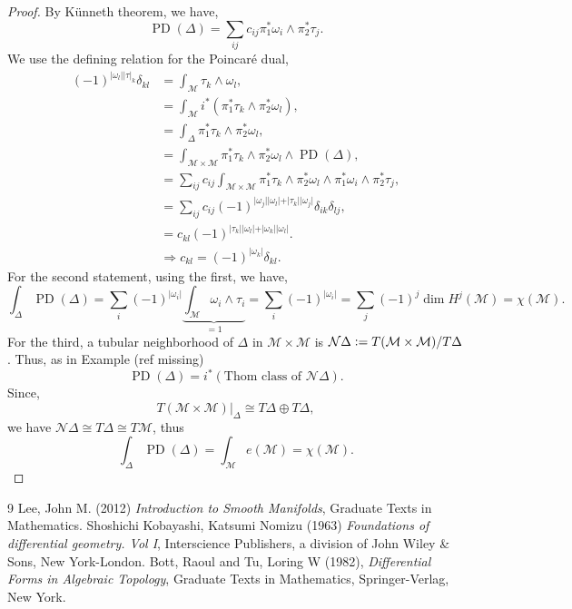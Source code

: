 \documentclass[8pt]{article}
\DeclareMathOperator{\PD}{PD}
\newcommand{\defeq}{\vcentcolon=}
\newcommand{\M}[0]{\mathcal{M}}
\begin{document}
\begin{proof}
  By Künneth theorem, we have,
  \begin{equation*}
    \PD(\Delta) = \sum_{ij}c_{ij}\pi_1^*\omega_i\wedge\pi_2^*\tau_j.
  \end{equation*}
  We use the defining relation for the Poincaré dual, 
  \begin{align*}
    (-1)^{\vert\omega_l\vert\vert\tau\vert_k}\delta_{kl}& =\int_\M\tau_k\wedge\omega_l,\\
    & = \int_\M i^*(\pi^*_1\tau_k\wedge\pi_2^*\omega_l),\\
    & = \int_\Delta \pi_1^*\tau_k\wedge\pi_2^*\omega_l,\\
    & = \int_{\M\times\M}\pi_1^*\tau_k\wedge\pi_2^*\omega_l\wedge\PD(\Delta),\\
    & = \sum_{ij}c_{ij}\int_{\M\times\M}\pi^*_1\tau_k\wedge\pi_2^*\omega_l\wedge\pi^*_1\omega_i\wedge\pi_2^*\tau_j,\\
    & = \sum_{ij}c_{ij}(-1)^{\vert\omega_j\vert\vert\omega_l\vert+\vert\tau_k\vert\vert\omega_j\vert}\delta_{ik}\delta_{lj},\\
    & = c_{kl}(-1)^{\vert\tau_k\vert\vert\omega_l\vert+\vert\omega_k\vert\vert\omega_l\vert}.\\
    &\Rightarrow c_{kl} = (-1)^{\vert\omega_k\vert}\delta_{kl}.
  \end{align*}
  For the second statement, using the first, we have,
  \begin{equation*}
    \int_\Delta\PD(\Delta) = \sum_{i}(-1)^{\vert\omega_i\vert}\underbrace{\int_\M\omega_i\wedge\tau_i}_{=1}=\sum_{i}(-1)^{\vert\omega_i\vert} = \sum_{j}(-1)^j\dim H^j(\M)=\chi(\M).
  \end{equation*}
  For the third, a tubular neighborhood of $\Delta$ in $\M\times\M$ is $\mathcal{N}\Delta\defeq T(\M\times\M)/T\Delta$. Thus, as in Example (ref missing)
  \begin{equation*}
    \PD(\Delta)=i^*(\text{Thom class of }\mathcal{N}\Delta).
  \end{equation*}
  Since,
  \begin{equation*}
    T(\M\times\M)|_\Delta\cong T\Delta\oplus T\Delta,
  \end{equation*}
  we have $\mathcal{N}\Delta\cong T\Delta\cong T\M$, thus 
  \begin{equation*}
    \int_\Delta\PD(\Delta) = \int_\M e(\M)=\chi(\M).
  \end{equation*}
\end{proof}

\begin{thebibliography}{9}
Lee, John M. (2012) \emph{Introduction to Smooth Manifolds}, Graduate Texts in Mathematics.
Shoshichi Kobayashi, Katsumi Nomizu (1963) \emph{Foundations of differential geometry. {V}ol {I}}, Interscience Publishers, a division of John Wiley \& Sons, New
              York-London.
 Bott, Raoul and Tu, Loring W (1982), \emph{Differential Forms in Algebraic Topology}, Graduate Texts in Mathematics, Springer-Verlag, New York.
\end{thebibliography}
\end{document}
